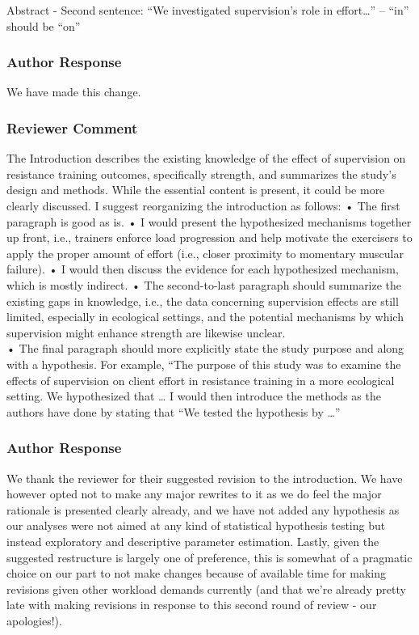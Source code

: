\documentclass[
  letterpaper,
  DIV=11,
  numbers=noendperiod]{scrartcl}
\begin{document}
Abstract - Second sentence: ``We investigated supervision's role in
effort\ldots{}'' -- ``in'' should be ``on''

\hypertarget{author-response-2}{%
\subsubsection{Author Response}\label{author-response-2}}

We have made this change.

\hypertarget{reviewer-comment-3}{%
\subsubsection{Reviewer Comment}\label{reviewer-comment-3}}

The Introduction describes the existing knowledge of the effect of
supervision on resistance training outcomes, specifically strength, and
summarizes the study's design and methods. While the essential content
is present, it could be more clearly discussed. I suggest reorganizing
the introduction as follows: • The first paragraph is good as is. • I
would present the hypothesized mechanisms together up front, i.e.,
trainers enforce load progression and help motivate the exercisers to
apply the proper amount of effort (i.e., closer proximity to momentary
muscular failure). • I would then discuss the evidence for each
hypothesized mechanism, which is mostly indirect. • The second-to-last
paragraph should summarize the existing gaps in knowledge, i.e., the
data concerning supervision effects are still limited, especially in
ecological settings, and the potential mechanisms by which supervision
might enhance strength are likewise unclear.\\
• The final paragraph should more explicitly state the study purpose and
along with a hypothesis. For example, ``The purpose of this study was to
examine the effects of supervision on client effort in resistance
training in a more ecological setting. We hypothesized that \ldots{} I
would then introduce the methods as the authors have done by stating
that ``We tested the hypothesis by \ldots{}''

\hypertarget{author-response-3}{%
\subsubsection{Author Response}\label{author-response-3}}

We thank the reviewer for their suggested revision to the introduction.
We have however opted not to make any major rewrites to it as we do feel
the major rationale is presented clearly already, and we have not added
any hypothesis as our analyses were not aimed at any kind of statistical
hypothesis testing but instead exploratory and descriptive parameter
estimation. Lastly, given the suggested restructure is largely one of
preference, this is somewhat of a pragmatic choice on our part to not
make changes because of available time for making revisions given other
workload demands currently (and that we're already pretty late with
making revisions in response to this second round of review - our
apologies!).
\end{document}
